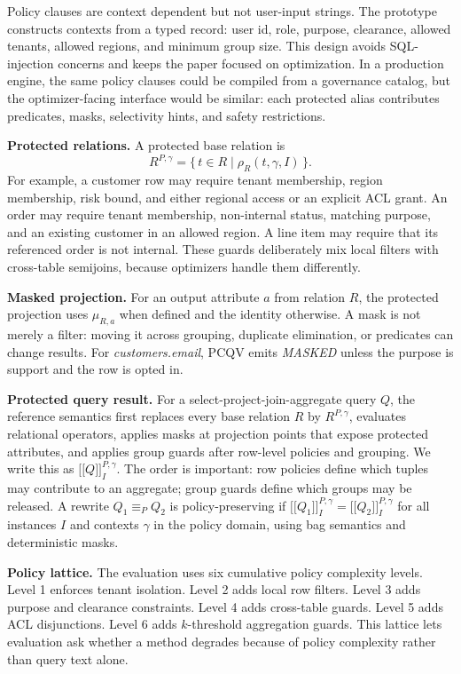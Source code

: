 \documentclass[conference]{IEEEtran}
\newcommand{\pcqv}{PCQV}
\newcommand{\ctx}{\gamma}
\newcommand{\sem}[1]{\mathopen{[\![}#1\mathclose{]\!]}}
\newcommand{\prot}[1]{#1^{P,\ctx}}
\begin{document}
Policy clauses are context dependent but not user-input strings. The prototype constructs contexts from a typed record: user id, role, purpose, clearance, allowed tenants, allowed regions, and minimum group size. This design avoids SQL-injection concerns and keeps the paper focused on optimization. In a production engine, the same policy clauses could be compiled from a governance catalog, but the optimizer-facing interface would be similar: each protected alias contributes predicates, masks, selectivity hints, and safety restrictions.


\textbf{Protected relations.} A protected base relation is
\begin{equation}
\prot{R} = \{\, t \in R \mid \rho_R(t,\ctx,I) \,\}.
\end{equation}
For example, a customer row may require tenant membership, region membership, risk bound, and either regional access or an explicit ACL grant. An order may require tenant membership, non-internal status, matching purpose, and an existing customer in an allowed region. A line item may require that its referenced order is not internal. These guards deliberately mix local filters with cross-table semijoins, because optimizers handle them differently.

\textbf{Masked projection.} For an output attribute $a$ from relation $R$, the protected projection uses $\mu_{R,a}$ when defined and the identity otherwise. A mask is not merely a filter: moving it across grouping, duplicate elimination, or predicates can change results. For \textit{customers.email}, \pcqv{} emits \textit{MASKED} unless the purpose is support and the row is opted in.

\textbf{Protected query result.} For a select-project-join-aggregate query $Q$, the reference semantics first replaces every base relation $R$ by $\prot{R}$, evaluates relational operators, applies masks at projection points that expose protected attributes, and applies group guards after row-level policies and grouping. We write this as $\sem{Q}^{P,\ctx}_I$. The order is important: row policies define which tuples may contribute to an aggregate; group guards define which groups may be released. A rewrite $Q_1 \equiv_{P} Q_2$ is policy-preserving if $\sem{Q_1}^{P,\ctx}_I = \sem{Q_2}^{P,\ctx}_I$ for all instances $I$ and contexts $\ctx$ in the policy domain, using bag semantics and deterministic masks.

\textbf{Policy lattice.} The evaluation uses six cumulative policy complexity levels. Level 1 enforces tenant isolation. Level 2 adds local row filters. Level 3 adds purpose and clearance constraints. Level 4 adds cross-table guards. Level 5 adds ACL disjunctions. Level 6 adds $k$-threshold aggregation guards. This lattice lets evaluation ask whether a method degrades because of policy complexity rather than query text alone.
\end{document}

